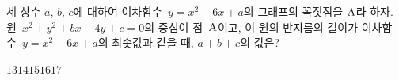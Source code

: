 세 상수 $a$, $b$, $c$에 대하여 이차함수~$y=x^2-6x+a$의 그래프의 꼭짓점을 $\mathrm{A}$라 하자. 원~$x^2+y^2+bx-4y+c=0$의 중심이 점~$\mathrm{A}$이고, 이 원의 반지름의 길이가 이차함수~$y=x^2-6x+a$의 최솟값과 같을 때, $a+b+c$의 값은?
\begin{choices32}{$13$}{$14$}{$15$}{$16$}{$17$}\end{choices32}
